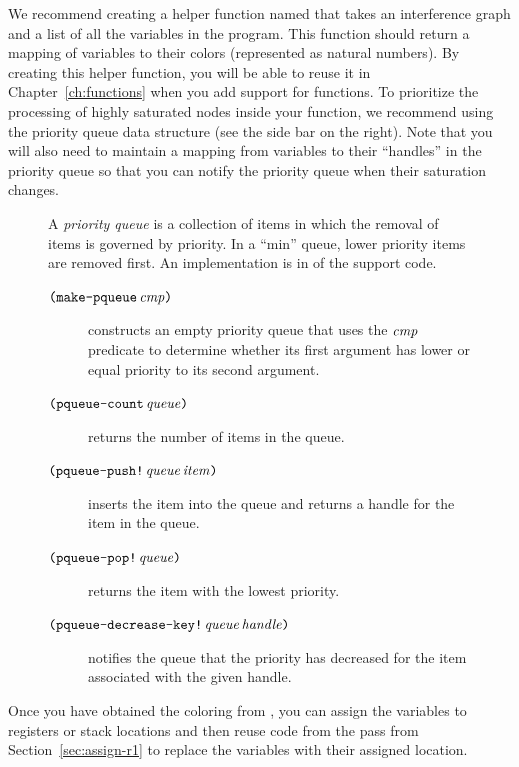 \documentclass[11pt]{book}
\begin{document}
We recommend creating a helper function named  that
takes an interference graph and a list of all the variables in the
program. This function should return a mapping of variables to their
colors (represented as natural numbers). By creating this helper
function, you will be able to reuse it in Chapter~\ref{ch:functions}
when you add support for functions.  To prioritize the processing of
highly saturated nodes inside your  function, we
recommend using the priority queue data structure (see the side bar on
the right). Note that you will also need to maintain a mapping from
variables to their ``handles'' in the priority queue so that you can
notify the priority queue when their saturation changes.

\begin{figure}
  \small
  \begin{tcolorbox}[title=Priority Queue]
    A \emph{priority queue} is a collection of items in which the
    removal of items is governed by priority. In a ``min'' queue,
    lower priority items are removed first. An implementation is in
     of the support code.   
  \begin{description}
  \item[$\texttt{(}\texttt{make-pqueue}\,\mathit{cmp}\texttt{)}$] constructs an empty
    priority queue that uses the $\mathit{cmp}$ predicate to determine
    whether its first argument has lower or equal priority to its
    second argument.
  \item[$\texttt{(}\texttt{pqueue-count}\,\mathit{queue}\texttt{)}$] returns the number of
    items in the queue.
  \item[$\texttt{(}\texttt{pqueue-push!}\,\mathit{queue}\,\mathit{item}\texttt{)}$] inserts
    the item into the queue and returns a handle for the item in the
    queue.
  \item[$\texttt{(}\texttt{pqueue-pop!}\,\mathit{queue}\texttt{)}$] returns the item with
    the lowest priority.
  \item[$\texttt{(}\texttt{pqueue-decrease-key!}\,\mathit{queue}\,\mathit{handle}\texttt{)}$]
    notifies the queue that the priority has decreased for the item
    associated with the given handle.
  \end{description}
\end{tcolorbox}
\end{figure}

Once you have obtained the coloring from , you can
assign the variables to registers or stack locations and then reuse
code from the  pass from
Section~\ref{sec:assign-r1} to replace the variables with their
assigned location. 
  
\end{document}
